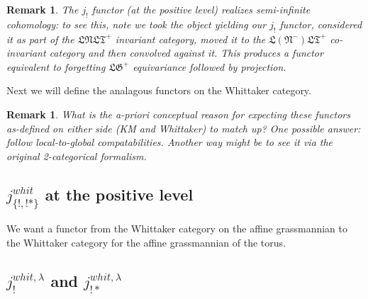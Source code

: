 \documentclass[12pt]{amsart}
\newtheorem{rmk}[thm]{Remark}
\newcommand\LT{\mathfrak{LT}}
\newcommand\LN{\mathfrak{LN}}
\newcommand\LNm{\mathfrak{L}(\mathfrak{N}^-)}
\newcommand\LG{\mathfrak{LG}}
\newcommand\DMod{\mathbf{Dmod}}
\newcommand\IC{\mathbf{IC}}
\newcommand\Gr{\mathbf{Gr}}
\newcommand\semiinf{\frac{\infty}{2}}
\newcommand\Whit{\mathbf{Whit}}
\newcommand\poslv{\kappa}
\begin{document}
  \begin{rmk}
    The $j_!$ functor (at the positive level) realizes semi-infinite cohomology:
    to see this, note we took the object yielding our $j_!$ functor, considered it
    as part of the $\LN\LT^+$ invariant category, moved it to the $\LNm\LT^+$
    co-invariant category and then convolved against it. This produces a functor
    equivalent to forgetting $\LG^+$ equivariance followed by projection.
  \end{rmk}

  Next we will define the analagous functors on the Whittaker category.


  \begin{rmk}
  What is the a-priori conceptual reason for expecting these
  functors as-defined on either side (KM and Whittaker) to match up? One
  possible answer: follow local-to-global compatabilities. Another way might be
  to see it via the original 2-categorical formalism.
  \end{rmk}

\subsection{$j_{\{!,!*\}}^{whit}$ at the positive level}

We want a functor from the Whittaker category on the affine
grassmannian\footnotemark{} to the Whittaker
category for the affine grassmannian of the
torus\footnotemark{}.


  \subsection{$j_!^{whit,\lambda}$ and $j_{!*}^{whit,\lambda}$}


\end{document}
